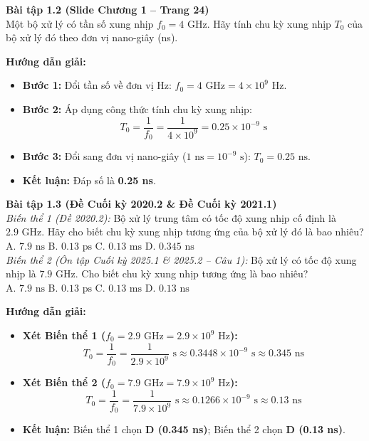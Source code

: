 \textbf{Bài tập 1.2 (Slide Chương 1 -- Trang 24)}\\
Một bộ xử lý có tần số xung nhịp $f_0 = 4\text{ GHz}$. Hãy tính chu kỳ xung nhịp $T_0$ của bộ xử lý đó theo đơn vị nano-giây (ns).

\textbf{Hướng dẫn giải:}
\begin{itemize}
    \item \textbf{Bước 1:} Đổi tần số về đơn vị Hz: $f_0 = 4\text{ GHz} = 4 \times 10^9\text{ Hz}$.
    \item \textbf{Bước 2:} Áp dụng công thức tính chu kỳ xung nhịp:
    $$T_0 = \frac{1}{f_0} = \frac{1}{4 \times 10^9} = 0.25 \times 10^{-9}\text{ s}$$
    \item \textbf{Bước 3:} Đổi sang đơn vị nano-giây ($1\text{ ns} = 10^{-9}\text{ s}$): $T_0 = 0.25\text{ ns}$.
    \item \textbf{Kết luận:} Đáp số là \textbf{0.25 ns}.
\end{itemize}

\textbf{Bài tập 1.3 (Đề Cuối kỳ 2020.2 \& Đề Cuối kỳ 2021.1)}\\
\textit{Biến thể 1 (Đề 2020.2):} Bộ xử lý trung tâm có tốc độ xung nhịp cố định là $2.9\text{ GHz}$. Hãy cho biết chu kỳ xung nhịp tương ứng của bộ xử lý đó là bao nhiêu?\\
A. $7.9\text{ ns}$ \quad B. $0.13\text{ ps}$ \quad C. $0.13\text{ ms}$ \quad D. $0.345\text{ ns}$\\[4pt]
\textit{Biến thể 2 (Ôn tập Cuối kỳ 2025.1 \& 2025.2 -- Câu 1):} Bộ xử lý có tốc độ xung nhịp là $7.9\text{ GHz}$. Cho biết chu kỳ xung nhịp tương ứng là bao nhiêu?\\
A. $7.9\text{ ns}$ \quad B. $0.13\text{ ps}$ \quad C. $0.13\text{ ms}$ \quad D. $0.13\text{ ns}$

\textbf{Hướng dẫn giải:}
\begin{itemize}
    \item \textbf{Xét Biến thể 1 ($f_0 = 2.9\text{ GHz} = 2.9 \times 10^9\text{ Hz}$):}
    $$T_0 = \frac{1}{f_0} = \frac{1}{2.9 \times 10^9}\text{ s} \approx 0.3448 \times 10^{-9}\text{ s} \approx 0.345\text{ ns}$$
    \item \textbf{Xét Biến thể 2 ($f_0 = 7.9\text{ GHz} = 7.9 \times 10^9\text{ Hz}$):}
    $$T_0 = \frac{1}{f_0} = \frac{1}{7.9 \times 10^9}\text{ s} \approx 0.1266 \times 10^{-9}\text{ s} \approx 0.13\text{ ns}$$
    \item \textbf{Kết luận:} Biến thể 1 chọn \textbf{D (0.345 ns)}; Biến thể 2 chọn \textbf{D (0.13 ns)}.
\end{itemize}

